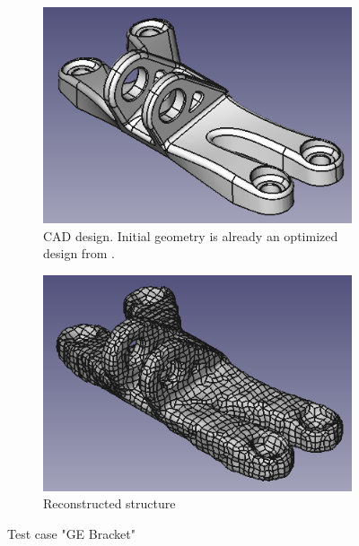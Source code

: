 \enlargethispage{2cm}
\begin{figure}[H]
\begin{center}
\begin{subfigure}[t]{.49\textwidth}
\begin{center}
\includegraphics[width=.9\textwidth]{Pictures/Results/BracketIn.png}
\end{center}
\caption{CAD design. Initial geometry is already an optimized design from \cite{GEBracketTripon}.}
\label{fig:GEbracketCAD}
\end{subfigure}
\hfill
\begin{subfigure}[t]{.49\textwidth}
\begin{center}
\includegraphics[width=.9\textwidth]{Pictures/Results/BracketOut.png}
\end{center}
\caption{Reconstructed structure}
\label{fig:GEbracketOPTIM}
\end{subfigure}
\caption{Test case "GE Bracket"}
\end{center}
\end{figure}

